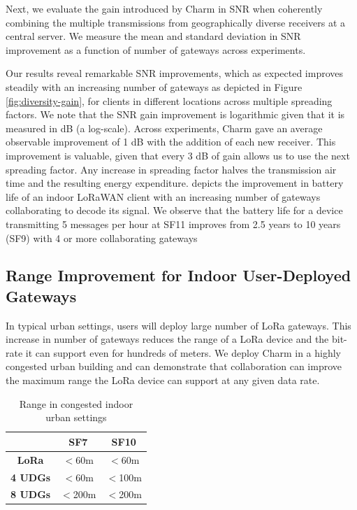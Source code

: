 Next, we evaluate the  gain introduced by Charm in SNR when coherently combining the multiple transmissions from geographically diverse receivers at a central server. We measure the mean and standard deviation in SNR improvement as a function of number of gateways across experiments.  

Our results reveal remarkable SNR improvements, which as expected improves steadily with an increasing number of gateways as depicted in Figure \ref{fig:diversity-gain}, for clients in different locations across multiple spreading factors. We note that the SNR gain improvement is logarithmic given that it is measured in dB (a log-scale). Across experiments, Charm gave an average observable improvement of 1 dB with the addition of each new receiver. This improvement is valuable, given that every 3 dB of gain allows us to use the next spreading factor. Any increase in spreading factor halves the transmission air time and the resulting energy expenditure.  depicts the improvement in battery life of an indoor LoRaWAN client with an increasing number of gateways collaborating to decode its signal. We observe that the battery life for a device transmitting 5 messages per hour at SF11 improves from 2.5 years to 10 years (SF9) with 4 or more collaborating gateways


\subsection{Range Improvement for Indoor User-Deployed Gateways}

In typical urban settings, users will deploy large number of LoRa gateways. This increase in number of gateways reduces the range of a LoRa device and the bit-rate it can support even for hundreds of meters. We deploy Charm in a highly congested urban building and can demonstrate that collaboration can improve the maximum range the LoRa device can support at any given data rate.


\begin{table}
\centering \begin{tabular}{||c | c | c||} 
 \hline
  & \textbf{SF7} & \textbf{SF10} \\ [0.5ex] 
 \hline\hline
 \textbf{LoRa} & $<$60m & $<$60m  \\ 
 \hline
 \textbf{4 UDGs} & $<$60m & $<$100m  \\
 \hline
 \textbf{8 UDGs} & $<$200m & $<$200m \\
 \hline
\end{tabular}
\caption{Range in congested indoor urban settings}
\label{tab:range}
\vspace*{-0.1in}
\end{table}

